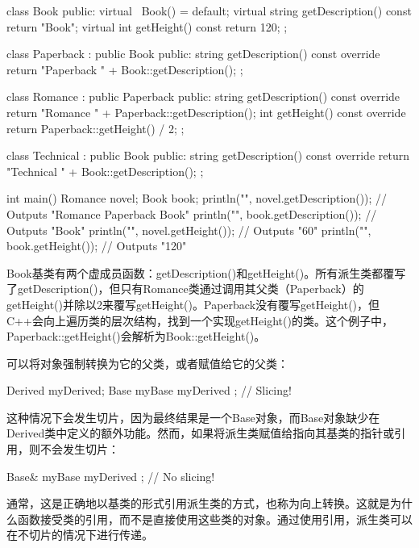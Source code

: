 \begin{cpp}
class Book
{
    public:
        virtual ~Book() = default;
        virtual string getDescription() const { return "Book"; }
        virtual int getHeight() const { return 120; }
};

class Paperback : public Book
{
    public:
        string getDescription() const override {
            return "Paperback " + Book::getDescription();
        }
};

class Romance : public Paperback
{
    public:
        string getDescription() const override {
            return "Romance " + Paperback::getDescription();
        }
        int getHeight() const override { return Paperback::getHeight() / 2; }
};

class Technical : public Book
{
    public:
        string getDescription() const override {
            return "Technical " + Book::getDescription();
        }
};

int main()
{
    Romance novel;
    Book book;
    println("{}", novel.getDescription()); // Outputs "Romance Paperback Book"
    println("{}", book.getDescription()); // Outputs "Book"
    println("{}", novel.getHeight()); // Outputs "60"
    println("{}", book.getHeight()); // Outputs "120"
}
\end{cpp}

Book基类有两个虚成员函数：getDescription()和getHeight()。所有派生类都覆写了getDescription()，但只有Romance类通过调用其父类（Paperback）的getHeight()并除以2来覆写getHeight()。Paperback没有覆写getHeight()，但C++会向上遍历类的层次结构，找到一个实现getHeight()的类。这个例子中，Paperback::getHeight()会解析为Book::getHeight()。


可以将对象强制转换为它的父类，或者赋值给它的父类：

\begin{cpp}
Derived myDerived;
Base myBase { myDerived }; // Slicing!
\end{cpp}

这种情况下会发生切片，因为最终结果是一个Base对象，而Base对象缺少在Derived类中定义的额外功能。然而，如果将派生类赋值给指向其基类的指针或引用，则不会发生切片：

\begin{cpp}
Base& myBase { myDerived }; // No slicing!
\end{cpp}

通常，这是正确地以基类的形式引用派生类的方式，也称为向上转换。这就是为什么函数接受类的引用，而不是直接使用这些类的对象。通过使用引用，派生类可以在不切片的情况下进行传递。

